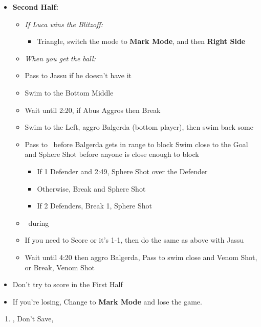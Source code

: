 {\begin{blitzball}
\begin{itemize}
		\item \textbf{Second Half:}
		      \begin{itemize}
			      \item \textit{If Luca wins the Blitzoff:}
			            \begin{itemize}
				            \item Triangle, switch the mode to \textbf{Mark Mode}, and then \textbf{Right Side}
			            \end{itemize}
			      \item \textit{When you get the ball:}
			      \item Pass to Jassu if he doesn't have it
			      \item Swim to the Bottom Middle
			      \item Wait until 2:20, if Abus Aggros then Break
			      \item Swim to the Left, aggro Balgerda (bottom player), then swim back some
			      \item Pass to \tidus\ before Balgerda gets in range to block
			            \tidusf Swim close to the Goal and Sphere Shot before anyone is close enough to block
			            \begin{itemize}
				            \item If 1 Defender and 2:49, Sphere Shot over the Defender
				            \item Otherwise, Break and Sphere Shot
				            \item If 2 Defenders, Break 1, Sphere Shot
			            \end{itemize}
			      \item \sd\ during \wakka\ \cs
			      \item If you need to Score or it's 1-1, then do the same as above with Jassu
			      \item Wait until 4:20 then aggro Balgerda, Pass to \wakka
			            \wakkaf swim close and Venom Shot, or Break, Venom Shot
		      \end{itemize}
		\item Don't try to score in the First Half
		\item If you're losing, Change to \textbf{Mark Mode} and lose the game.
	\end{itemize}
\end{blitzball}
\begin{enumerate}[resume]
	\item \sd, Don't Save, \cs[1:00]
\end{enumerate}
}
